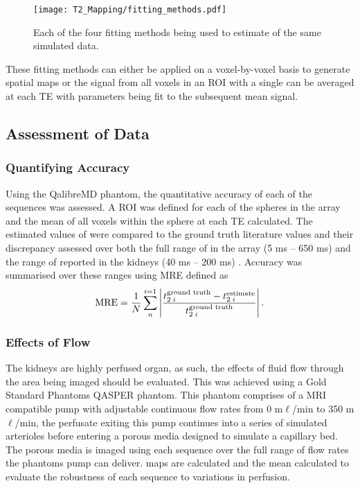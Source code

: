 \begin{figure}[H]
	\centering
	\texttt{[image: T2\_Mapping/fitting\_methods.pdf]}
	\caption{Each of the four fitting methods being used to estimate \ttwo of the same simulated data.}
	\label{fig:t2_fitting_methods}	
\end{figure}

These fitting methods can either be applied on a voxel-by-voxel basis to generate spatial maps or the signal from all voxels in an \ac{ROI} with a single \ttwo can be averaged at each \ac{TE} with parameters being fit to the subsequent mean signal. 

\subsection{Assessment of Data}

\subsubsection{Quantifying Accuracy}
Using the QalibreMD phantom, the quantitative accuracy of each of the sequences was assessed. A \ac{ROI} was defined for each of the spheres in the \ttwo array and the mean of all voxels within the sphere at each \ac{TE} calculated. The estimated values of \ttwo were compared to the ground truth literature values and their discrepancy assessed over both the full range of \ttwo in the array (5 ms – 650 ms) and the range of \ttwo reported in the kidneys (40 ms – 200 ms) \cite{wolf_magnetic_2018}. Accuracy was summarised over these ranges using \ac{MRE} defined as 
\begin{equation}
	\textup{MRE} = \frac{1}{N}\sum_{n}^{i=1}\left|  \frac{t_{2\; i}^{\textup{ground truth}} - t_{2\; i}^{\textup{estimate}}}{t_{2\; i}^{\textup{ground truth}}}\right|.
	\label{eq:t2_mre}
\end{equation}

\subsubsection{Effects of Flow}
The kidneys are highly perfused organ, as such, the effects of fluid flow through the area being imaged should be evaluated. This was achieved using a Gold Standard Phantoms \ac{QASPER} phantom. This phantom comprises of a \ac{MRI} compatible pump with adjustable continuous flow rates from 0 m$\ell$/min to 350 m$\ell$/min, the perfusate exiting this pump continues into a series of simulated arterioles before entering a porous media designed to simulate a capillary bed. The porous media is imaged using each sequence over the full range of flow rates the phantoms pump can deliver. \ttwo maps are calculated and the mean \ttwo calculated to evaluate the robustness of each sequence to variations in perfusion.

